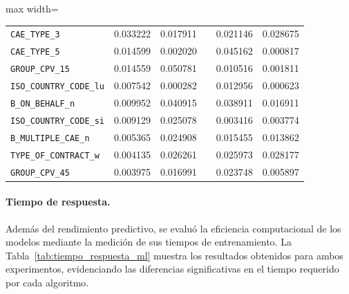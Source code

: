 \documentclass[a4paper,fleqn]{cas-sc}
\begin{document}
\begin{table}[t]
\begin{adjustbox}{max width=\textwidth}
\begin{tabular}{p{3.5cm}rrcrr}
		\texttt{CAE\_TYPE\_3}                             & 0.033222               & 0.017911            &       & 0.021146               & 0.028675                   \\ %
		\texttt{CAE\_TYPE\_5}                            & 0.014599               & 0.002020             &      & 0.045162               & 0.000817                   \\ %
		\texttt{GROUP\_CPV\_15}                           & 0.014559               & 0.050781          &         & 0.010516               & 0.001811                   \\ %
		\texttt{ISO\_COUNTRY\_CODE\_lu}                   & 0.007542               & 0.000282       &            & 0.012956               & 0.000623                   \\ %
		\texttt{B\_ON\_BEHALF\_n}                        & 0.009952               & 0.040915               &    & 0.038911               & 0.016911                   \\ %
		\texttt{ISO\_COUNTRY\_CODE\_si}                  & 0.009129               & 0.025078           &        & 0.003416               & 0.003774                   \\ %
		\texttt{B\_MULTIPLE\_CAE\_n}                      & 0.005365               & 0.024908              &     & 0.015455               & 0.013862                   \\ %
		\texttt{TYPE\_OF\_CONTRACT\_w}                    & 0.004135               & 0.026261            &       & 0.025973               & 0.028177                   \\ %
		\texttt{GROUP\_CPV\_45}                          & 0.003975               & 0.016991               &    & 0.023748               & 0.005897                   \\ \hline
	\end{tabular}
	\end{adjustbox}	

\end{table}


\paragraph{\textbf{Tiempo de respuesta.}}

	Además del rendimiento predictivo, se evaluó la eficiencia computacional de los modelos mediante la medición de sus tiempos de entrenamiento. 
La Tabla~\ref{tab:tiempo_respuesta_ml} muestra los resultados obtenidos para ambos experimentos, evidenciando las diferencias significativas en el tiempo requerido por cada algoritmo.
\end{document}
